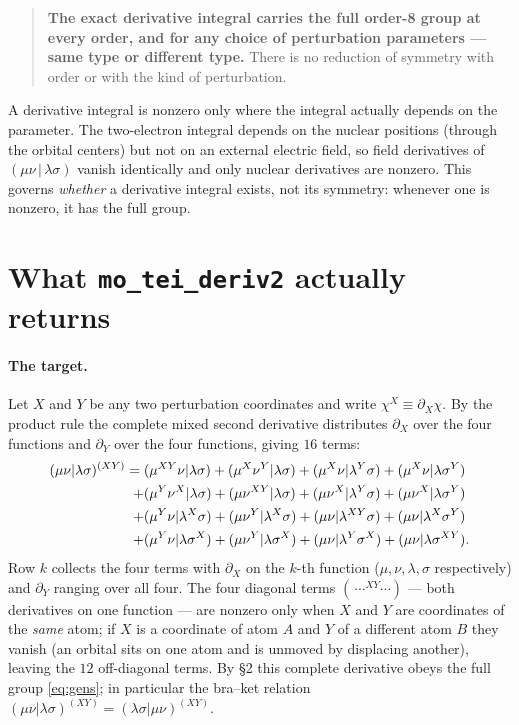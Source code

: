 \documentclass[11pt]{article}
\newcommand{\ci}[4]{(#1#2\,|\,#3#4)}          %
\newcommand{\pd}[1]{\partial_{#1}}
\begin{document}
\begin{quote}
\textbf{The exact derivative integral carries the full order-8 group at every
order, and for any choice of perturbation parameters --- same type or different
type.} There is no reduction of symmetry with order or with the kind of
perturbation.
\end{quote}
%
A derivative integral is nonzero only where the integral actually depends on the
parameter. The two-electron integral depends on the nuclear positions (through the
orbital centers) but not on an external electric field, so field derivatives of
$\ci{\mu}{\nu}{\lambda}{\sigma}$ vanish identically and only nuclear derivatives
are nonzero. This governs \emph{whether} a derivative integral exists, not its
symmetry: whenever one is nonzero, it has the full group.

\section{What \texttt{mo\_tei\_deriv2} actually returns}

\paragraph{The target.} Let $X$ and $Y$ be any two perturbation coordinates and
write $\chi^{X}\equiv\pd{X}\chi$. By the product rule the complete mixed second
derivative distributes $\pd{X}$ over the four functions and $\pd{Y}$ over the four
functions, giving $16$ terms:
%
\begin{align}
(\mu\nu|\lambda\sigma)^{(XY)}
={}& (\mu^{XY}\nu|\lambda\sigma) + (\mu^{X}\nu^{Y}|\lambda\sigma)
   + (\mu^{X}\nu|\lambda^{Y}\sigma) + (\mu^{X}\nu|\lambda\sigma^{Y}) \notag\\
 +{}& (\mu^{Y}\nu^{X}|\lambda\sigma) + (\mu\nu^{XY}|\lambda\sigma)
   + (\mu\nu^{X}|\lambda^{Y}\sigma) + (\mu\nu^{X}|\lambda\sigma^{Y}) \notag\\
 +{}& (\mu^{Y}\nu|\lambda^{X}\sigma) + (\mu\nu^{Y}|\lambda^{X}\sigma)
   + (\mu\nu|\lambda^{XY}\sigma) + (\mu\nu|\lambda^{X}\sigma^{Y}) \notag\\
 +{}& (\mu^{Y}\nu|\lambda\sigma^{X}) + (\mu\nu^{Y}|\lambda\sigma^{X})
   + (\mu\nu|\lambda^{Y}\sigma^{X}) + (\mu\nu|\lambda\sigma^{XY}) .
\label{eq:complete}
\end{align}
%
Row $k$ collects the four terms with $\pd{X}$ on the $k$-th function
($\mu,\nu,\lambda,\sigma$ respectively) and $\pd{Y}$ ranging over all four. The
four diagonal terms $(\,\cdots^{XY}\cdots)$ --- both derivatives on one function
--- are nonzero only when $X$ and $Y$ are coordinates of the \emph{same} atom; if
$X$ is a coordinate of atom $A$ and $Y$ of a different atom $B$ they vanish (an
orbital sits on one atom and is unmoved by displacing another), leaving the $12$
off-diagonal terms. By \S2 this complete derivative obeys the full group
\eqref{eq:gens}; in particular the bra--ket relation
$(\mu\nu|\lambda\sigma)^{(XY)}=(\lambda\sigma|\mu\nu)^{(XY)}$.
\end{document}
